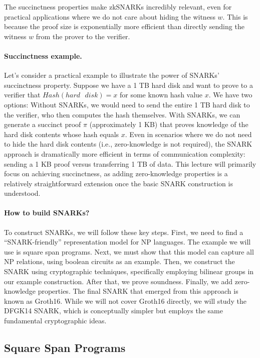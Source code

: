 \documentclass[12pt]{tufte-book}
\begin{document}
The succinctness properties make zkSNARKs incredibly relevant, even for practical applications where we do not care about hiding the witness $w$. This is because the proof size is exponentially more efficient than directly sending the witness $w$ from the prover to the verifier.

\paragraph{Succinctness example.} Let's consider a practical example to illustrate the power of SNARKs' succinctness property. Suppose we have a 1 TB hard disk and want to prove to a verifier that $Hash(hard\text{ }disk) = x$ for some known hash value $x$. We have two options: Without SNARKs, we would need to send the entire 1 TB hard disk to the verifier, who then computes the hash themselves. With SNARKs, we can generate a succinct proof $\pi$ (approximately 1 KB) that proves knowledge of the hard disk contents whose hash equals $x$. Even in scenarios where we do not need to hide the hard disk contents (i.e., zero-knowledge is not required), the SNARK approach is dramatically more efficient in terms of communication complexity: sending a 1 KB proof versus transferring 1 TB of data. This lecture will primarily focus on achieving succinctness, as adding zero-knowledge properties is a relatively straightforward extension once the basic SNARK construction is understood.

\paragraph{How to build SNARKs?} To construct SNARKs, we will follow these key steps. First, we need to find a ``SNARK-friendly'' representation model for NP languages. The example we will use is square span programs. Next, we must show that this model can capture all NP relations, using boolean circuits as an example. Then, we construct the SNARK using cryptographic techniques, specifically employing bilinear groups in our example construction. After that, we prove soundness. Finally, we add zero-knowledge properties. The final SNARK that emerged from this approach is known as Groth16. While we will not cover Groth16 directly, we will study the DFGK14 SNARK, which is conceptually simpler but employs the same fundamental cryptographic ideas.

\subsection{Square Span Programs}
\end{document}
